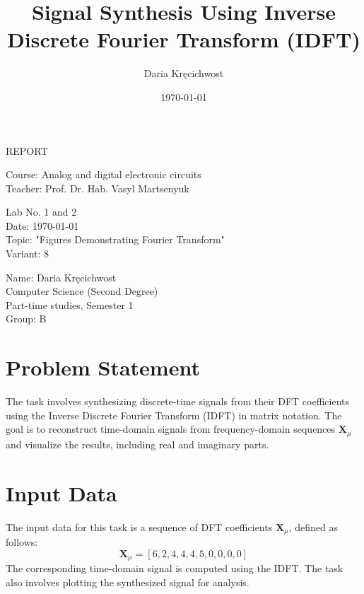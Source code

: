 \documentclass[12pt]{article}
\title{Signal Synthesis Using Inverse Discrete Fourier Transform (IDFT)}
\author{Daria Kręcichwost}
\date{\today}
\begin{document}
\begin{titlepage}
    \centering
    \vspace*{2cm}
    
    \Huge
    REPORT
    
    \vspace{1cm}
    
    \Large
    Course: Analog and digital electronic circuits \\
    Teacher: Prof. Dr. Hab. Vasyl Martsenyuk
    
    \vfill
    
    \Large
    Lab No. 1 and 2\\
    Date: \today \\
    Topic: "Figures Demonstrating Fourier Transform" \\
    Variant: 8
    
    \vspace{1cm}
    
    \large
    Name: Daria Kręcichwost \\
    Computer Science (Second Degree) \\
    Part-time studies, Semester 1 \\
    Group: B
\end{titlepage}

\newpage

\maketitle


\section{Problem Statement}
The task involves synthesizing discrete-time signals from their DFT coefficients using the Inverse Discrete Fourier Transform (IDFT) in matrix notation. The goal is to reconstruct time-domain signals from frequency-domain sequences \( \mathbf{X}_\mu \) and visualize the results, including real and imaginary parts.

\section{Input Data}
The input data for this task is a sequence of DFT coefficients \( \mathbf{X}_\mu \), defined as follows:
\[
\mathbf{X}_\mu = [6, 2, 4, 4, 4, 5, 0, 0, 0, 0]
\]
The corresponding time-domain signal is computed using the IDFT. The task also involves plotting the synthesized signal for analysis.
\end{document}
